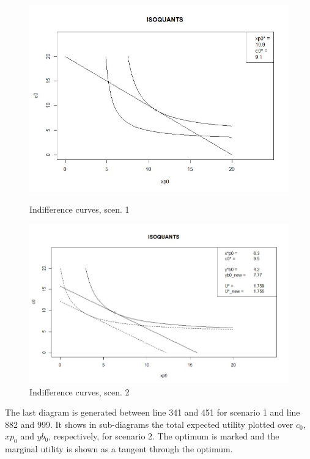 \begin{figure}[h!]
  \centering
  \begin{minipage}[b]{0.45\textwidth}
    \includegraphics[width=\textwidth, trim = 0 0 0 40,clip]{files/2.2.jpg}
    \caption{Indifference curves, scen. 1}
  \end{minipage}
  \hfill
  \begin{minipage}[b]{0.53\textwidth}
    \includegraphics[width=\textwidth, trim = 0 0 0 40,clip]{files/3.2.jpg}
    \caption{Indifference curves, scen. 2}
  \end{minipage}
\end{figure}

\bigskip

\noindent The last diagram is generated between line 341 and 451 for scenario 1 and line 882 and 999. It shows in sub-diagrams the total expected utility plotted over $c_0$, $xp_0$ and $yb_0$, respectively, for scenario 2. The optimum is marked and the marginal utility is shown as a tangent through the optimum.\\

